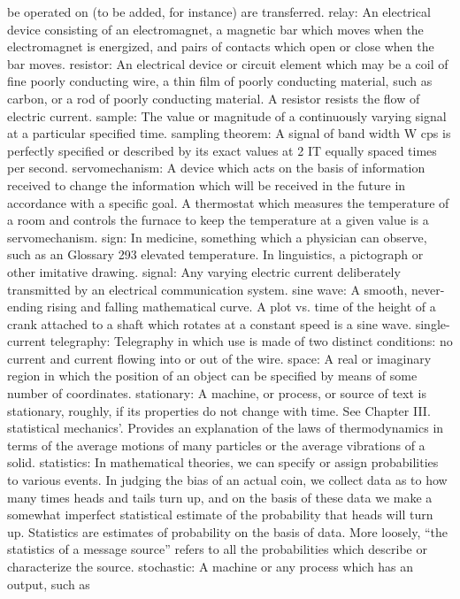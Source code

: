 {{{{{{{{{{{{{{{be operated on (to be added, for instance) are transferred.
relay: An electrical device consisting of an electromagnet, a magnetic bar
which moves when the electromagnet is energized, and pairs of
contacts which open or close when the bar moves.
resistor: An electrical device or circuit element which may be a coil of
fine poorly conducting wire, a thin film of poorly conducting
material, such as carbon, or a rod of poorly conducting material.
A resistor resists the flow of electric current.
sample: The value or magnitude of a continuously varying signal at a
particular specified time.
sampling theorem: A signal of band width W cps is perfectly specified
or described by its exact values at 2 IT equally spaced times per
second.
servomechanism: A device which acts on the basis of information received
to change the information which will be received in the future in
accordance with a specific goal. A thermostat which measures the
temperature of a room and controls the furnace to keep the temperature
at a given value is a servomechanism.
sign: In medicine, something which a physician can observe, such as an
Glossary 293
elevated temperature. In linguistics, a pictograph or other imitative
drawing.
signal: Any varying electric current deliberately transmitted by an electrical
communication system.
sine wave: A smooth, never-ending rising and falling mathematical curve.
A plot vs. time of the height of a crank attached to a shaft which
rotates at a constant speed is a sine wave.
single-current telegraphy: Telegraphy in which use is made of two
distinct conditions: no current and current flowing into or out of
the wire.
space: A real or imaginary region in which the position of an object can
be specified by means of some number of coordinates.
stationary: A machine, or process, or source of text is stationary, roughly,
if its properties do not change with time. See Chapter III.
statistical mechanics'. Provides an explanation of the laws of thermodynamics
in terms of the average motions of many particles or the
average vibrations of a solid.
statistics: In mathematical theories, we can specify or assign probabilities
to various events. In judging the bias of an actual coin, we collect
data as to how many times heads and tails turn up, and on the basis
of these data we make a somewhat imperfect statistical estimate
of the probability that heads will turn up. Statistics are estimates
of probability on the basis of data. More loosely, “the statistics of
a message source” refers to all the probabilities which describe or
characterize the source.
stochastic: A machine or any process which has an output, such as
}}}}}}}}}}}}}}}

